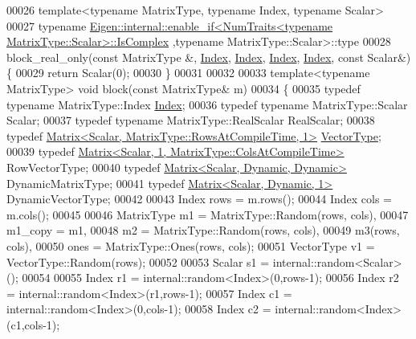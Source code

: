 \begin{DoxyCode}
00026 \textcolor{keyword}{template}<\textcolor{keyword}{typename} MatrixType, \textcolor{keyword}{typename} Index, \textcolor{keyword}{typename} Scalar>
00027 \textcolor{keyword}{typename} 
      \hyperlink{struct_eigen_1_1internal_1_1enable__if}{Eigen::internal::enable\_if<NumTraits<typename MatrixType::Scalar>::IsComplex}
      ,\textcolor{keyword}{typename} MatrixType::Scalar>::type
00028 block\_real\_only(\textcolor{keyword}{const} MatrixType &, \hyperlink{namespace_eigen_a62e77e0933482dafde8fe197d9a2cfde}{Index}, \hyperlink{namespace_eigen_a62e77e0933482dafde8fe197d9a2cfde}{Index}, \hyperlink{namespace_eigen_a62e77e0933482dafde8fe197d9a2cfde}{Index}, \hyperlink{namespace_eigen_a62e77e0933482dafde8fe197d9a2cfde}{Index}, \textcolor{keyword}{const} Scalar&) \{
00029   \textcolor{keywordflow}{return} Scalar(0);
00030 \}
00031 
00032 
00033 \textcolor{keyword}{template}<\textcolor{keyword}{typename} MatrixType> \textcolor{keywordtype}{void} block(\textcolor{keyword}{const} MatrixType& m)
00034 \{
00035   \textcolor{keyword}{typedef} \textcolor{keyword}{typename} MatrixType::Index \hyperlink{namespace_eigen_a62e77e0933482dafde8fe197d9a2cfde}{Index};
00036   \textcolor{keyword}{typedef} \textcolor{keyword}{typename} MatrixType::Scalar Scalar;
00037   \textcolor{keyword}{typedef} \textcolor{keyword}{typename} MatrixType::RealScalar RealScalar;
00038   \textcolor{keyword}{typedef} \hyperlink{group___core___module_class_eigen_1_1_matrix}{Matrix<Scalar, MatrixType::RowsAtCompileTime, 1>} 
      \hyperlink{struct_vector_type}{VectorType};
00039   \textcolor{keyword}{typedef} \hyperlink{group___core___module_class_eigen_1_1_matrix}{Matrix<Scalar, 1, MatrixType::ColsAtCompileTime>} 
      RowVectorType;
00040   \textcolor{keyword}{typedef} \hyperlink{group___core___module}{Matrix<Scalar, Dynamic, Dynamic>} DynamicMatrixType;
00041   \textcolor{keyword}{typedef} \hyperlink{group___core___module}{Matrix<Scalar, Dynamic, 1>} DynamicVectorType;
00042   
00043   Index rows = m.rows();
00044   Index cols = m.cols();
00045 
00046   MatrixType m1 = MatrixType::Random(rows, cols),
00047              m1\_copy = m1,
00048              m2 = MatrixType::Random(rows, cols),
00049              m3(rows, cols),
00050              ones = MatrixType::Ones(rows, cols);
00051   VectorType v1 = VectorType::Random(rows);
00052 
00053   Scalar s1 = internal::random<Scalar>();
00054 
00055   Index r1 = internal::random<Index>(0,rows-1);
00056   Index r2 = internal::random<Index>(r1,rows-1);
00057   Index c1 = internal::random<Index>(0,cols-1);
00058   Index c2 = internal::random<Index>(c1,cols-1);

\end{DoxyCode}
